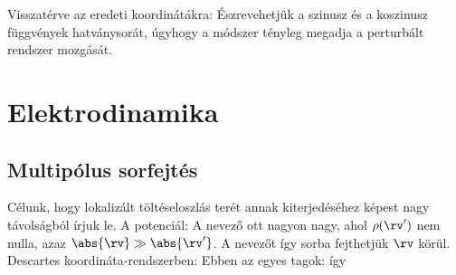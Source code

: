 \begin{itemize}
      Visszatérve az eredeti koordinátákra:
      Észrevehetjük a szinusz és a koszinusz függvények hatványsorát, úgyhogy a módszer tényleg megadja a perturbált rendszer mozgását.
      
    \end{itemize}
   
 \section{Elektrodinamika}
  
  \subsection{Multipólus sorfejtés}\label{eq:ss-11multipol}
   
   Célunk, hogy lokalizált töltéseloszlás terét annak kiterjedéséhez képest nagy távolságból írjuk le.
   A potenciál:
   A nevező ott nagyon nagy, ahol $\rho(\rv')$ nem nulla, azaz $\abs{\rv}\gg\abs{\rv'}$.
   A nevezőt így sorba fejthetjük $\rv$ körül.
   Descartes koordináta-rendszerben:
   Ebben az egyes tagok:
   így 
   
